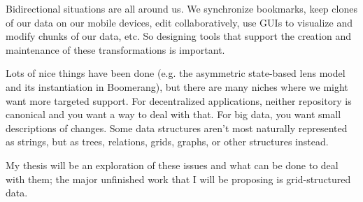 Bidirectional situations are all around us. We synchronize bookmarks, keep
clones of our data on our mobile devices, edit collaboratively, use GUIs to
visualize and modify chunks of our data, etc. So designing tools that
support the creation and maintenance of these transformations is important.

Lots of nice things have been done (e.g. the asymmetric state-based lens
model and its instantiation in Boomerang), but there are many niches where
we might want more targeted support. For decentralized applications, neither
repository is canonical and you want a way to deal with that. For big data,
you want small descriptions of changes. Some data structures aren't most
naturally represented as strings, but as trees, relations, grids, graphs, or
other structures instead.

My thesis will be an exploration of these issues and what can be done to
deal with them; the major unfinished work that I will be proposing is
grid-structured data.
